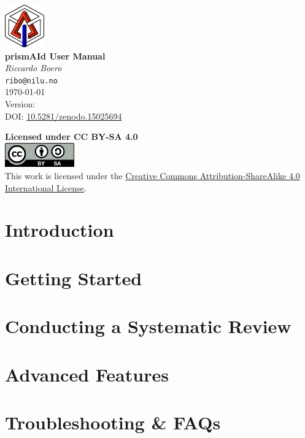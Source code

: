 \documentclass{tufte-book}
\makeatletter
\newcommand{\docversion}{}
\newcommand{\customtitle}{
    \begin{titlepage}
    \begin{fullwidth}
        \centering
        \vspace*{3cm}
            \includegraphics{figures/prismAId_logo.png}\\[0.5cm]
        {\Huge\bfseries\sffamily prism\textcolor{brightred}{A}\textcolor{brightblue}{I}d User Manual}\\[2cm]
        {\Large\textit{Riccardo Boero}}\\[0.3cm]
        \texttt{ribo@nilu.no}\\[1cm]
        {\large\today}\\[0.3cm]  %
        {\large Version: \docversion}\\[2cm]  %
        DOI: \href{https://doi.org/10.5281/zenodo.15025694}{10.5281/zenodo.15025694}  %

        \vfill
        \noindent
        \begin{minipage}{0.8\textwidth}
            \centering
            \textbf{Licensed under CC BY-SA 4.0} \\[0.5cm]
            \includegraphics[width=3cm]{figures/by-sa.png} \\[0.5cm]  %
            This work is licensed under the
            \href{https://creativecommons.org/licenses/by-sa/4.0/}{Creative Commons Attribution-ShareAlike 4.0 International License}.
        \end{minipage}
    \end{fullwidth}
    \end{titlepage}
    \thispagestyle{plain}  %
}
\makeatother
\begin{document}
\lstset{showstringspaces=false}
\customtitle  %

\begin{fullwidth}
\tableofcontents  %
\end{fullwidth}
\newpage


\cleardoublepage
\markboth{}{}  %
\pagestyle{fancy}

\part{Introduction}


\part{Getting Started}


\part{Conducting a Systematic Review}


\part{Advanced Features}


\part{Troubleshooting \& FAQs}

\end{document}
